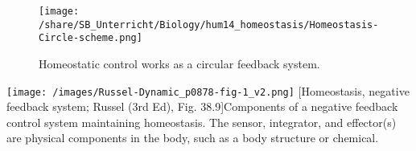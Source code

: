 	 \areaset[0cm]{16cm}{27.4cm}  

			\begin{figure}[htp]
		  \texttt{[image: /share/SB\_Unterricht/Biology/hum14\_homeostasis/Homeostasis-Circle-scheme.png]}
		  \caption[Homeostasis circular model, according to natura3]{ Homeostatic control works as a circular feedback system.}
		  \label{fig:HomeostasisCircle}
		\end{figure}
	
	\vfill
	\hspace{-2cm}
\begin{minipage}{18cm}
 		 \texttt{[image: /images/Russel-Dynamic\_p0878-fig-1\_v2.png]}
[Homeostasis, negative feedback system; Russel (3rd Ed), Fig. 38.9]{Components of a negative feedback control system maintaining homeostasis. The sensor, integrator, and effector(s) are physical components in the body, such as a body structure or chemical.}\label{fig:HomeostasisNegativeFeedback}
\end{minipage}
	\vfill
	

